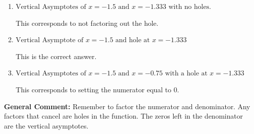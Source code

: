 \documentclass{extbook}[14pt]
\begin{document}
\begin{enumerate}
{\begin{enumerate}[label=\Alph*.]
This corresponds to considering where the denominator is equal to 0 as holes.
\item \( \text{Vertical Asymptotes of } x = -1.5 \text{ and } x = -1.333 \text{ with no holes.} \)

This corresponds to not factoring out the hole.
\item \( \text{Vertical Asymptote of } x = -1.5 \text{ and hole at } x = -1.333 \)

This is the correct answer.
\item \( \text{Vertical Asymptotes of } x = -1.5 \text{ and } x = -0.75 \text{ with a hole at } x = -1.333 \)

This corresponds to setting the numerator equal to 0.
\end{enumerate}

\textbf{General Comment:} Remember to factor the numerator and denominator. Any factors that cancel are holes in the function. The zeros left in the denominator are the vertical asymptotes.
}
\end{enumerate}
\end{document}
